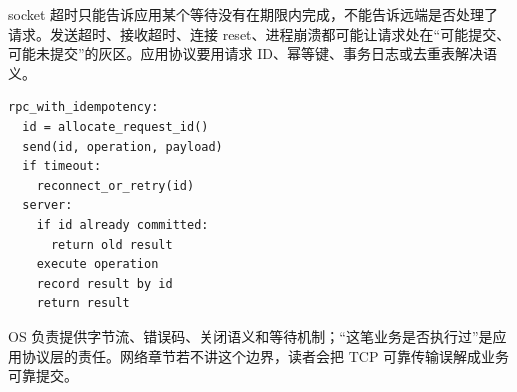 socket 超时只能告诉应用某个等待没有在期限内完成，不能告诉远端是否处理了请求。发送超时、接收超时、连接 reset、进程崩溃都可能让请求处在“可能提交、可能未提交”的灰区。应用协议要用请求 ID、幂等键、事务日志或去重表解决语义。

\begin{lstlisting}
rpc_with_idempotency:
  id = allocate_request_id()
  send(id, operation, payload)
  if timeout:
    reconnect_or_retry(id)
  server:
    if id already committed:
      return old result
    execute operation
    record result by id
    return result
\end{lstlisting}

OS 负责提供字节流、错误码、关闭语义和等待机制；“这笔业务是否执行过”是应用协议层的责任。网络章节若不讲这个边界，读者会把 TCP 可靠传输误解成业务可靠提交。

